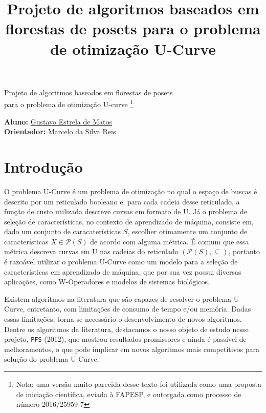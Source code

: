 \documentclass[12pt]{article}
\title{Projeto de algoritmos baseados em florestas de posets
para o problema de otimização U-Curve}
\begin{document}
\thispagestyle{empty} 
\begin{flushright}
    {\LARGE Projeto de algoritmos baseados em florestas de posets\\
        \bigskip 
        para o problema de otimização U-curve \footnote{Nota: uma versão
        muito parecida desse texto foi utilizada como uma proposta de
        iniciação científica, eviada à FAPESP, e outorgada como processo
        de número 2016/25959-7}}


  \bigskip
  \bigskip
        
  {\large {\bf Aluno:} \href{mailto:gustavo.estrela.matos@usp.br}{Gustavo Estrela de Matos}\\ 
  {\bf Orientador:} \href{mailto:marcelo.reis@butantan.gov.br}{Marcelo da Silva Reis}\\
  \bigskip
  }

  \bigskip
  \bigskip
\end{flushright}


\section{Introdução}

O problema U-Curve é um problema de otimização no qual o espaço de 
buscas é descrito por um reticulado booleano e, para cada cadeia desse
reticulado, a função de custo utilizada descreve curvas em formato de U.
Já o problema de seleção de características, no contexto de aprendizado
de máquina, consiste em, dado um conjunto de caracaterísticas $S$,
escolher otimamente um conjunto de características 
$X \in \mathcal{P}(S)$ de acordo com alguma métrica. É comum que essa
métrica descreva curvas em U nas cadeias do reticulado $(\mathcal{P}(S),
\subseteq)$, portanto é razoável utilizar o problema U-Curve como um
modelo para a seleção de características em aprendizado de máquina, que
por sua vez possui diversas aplicações, como W-Operadores e modelos de
sistemas biológicos. 

Existem algoritmos na literatura que são capazes de resolver o problema
U-Curve, entretanto, com limitações de consumo de tempo e/ou memória.
Dadas essas limitações, torna-se necessário o desenvolvimento de novos
algoritmos. Dentre os algoritmos da literatura, destacamos o nosso 
objeto de estudo nesse projeto, {\tt PFS} (2012), que mostrou resultados
promissores e ainda é passível de melhoramentos, o que pode implicar em
novos algoritmos mais competitivos para solução do problema U-Curve.
\end{document}

